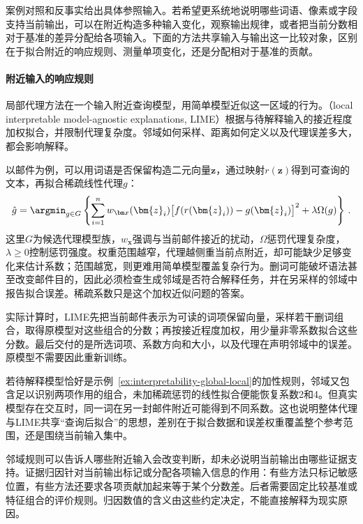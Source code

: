 案例对照和反事实给出具体参照输入。若希望更系统地说明哪些词语、像素或字段支持当前输出，可以在附近构造多种输入变化，观察输出规律，或者把当前分数相对于基准的差异分配给各项输入。下面的方法共享输入与输出这一比较对象，区别在于拟合附近的响应规则、测量单项变化，还是分配相对于基准的贡献。

\paragraph{附近输入的响应规则}
\label{sec:interpretability-local-neighborhood}

局部代理方法在一个输入附近查询模型，用简单模型近似这一区域的行为。（local interpretable model-agnostic explanations, LIME）根据与待解释输入的接近程度加权拟合，并限制代理复杂度。邻域如何采样、距离如何定义以及代理误差多大，都会影响解释。

以邮件为例，可以用词语是否保留构造二元向量$\bm{z}$，通过映射$r(\bm{z})$得到可查询的文本，再拟合稀疏线性代理$g$：
\begin{equation}
 \hat g=\argmin_{g\in G}\left\{
 \sum_{i=1}^{n}w_{\bm x}(\bm{z}_i)
 \bigl[f(r(\bm{z}_i))-g(\bm{z}_i)\bigr]^2
 +\lambda\Omega(g)\right\}\, .
 \label{eq:interpretability-lime}
\end{equation}
这里$G$为候选代理模型族，$w_{\bm x}$强调与当前邮件接近的扰动，$\Omega$惩罚代理复杂度，$\lambda\geq0$控制惩罚强度。权重范围越窄，代理越侧重当前点附近，却可能缺少足够变化来估计系数；范围越宽，则更难用简单模型覆盖复杂行为。删词可能破坏语法甚至改变邮件目的，因此必须检查生成邻域是否符合解释任务，并在另采样的邻域中报告拟合误差。稀疏系数只是这个加权近似问题的答案。

实际计算时，LIME先把当前邮件表示为可读的词项保留向量，采样若干删词组合，取得原模型对这些组合的分数；再按接近程度加权，用少量非零系数拟合这些分数。最后交付的是所选词项、系数方向和大小，以及代理在声明邻域中的误差。原模型不需要因此重新训练。

若待解释模型恰好是示例~\ref{ex:interpretability-global-local}的加性规则，邻域又包含足以识别两项作用的组合，未加稀疏惩罚的线性拟合便能恢复系数2和4。但真实模型存在交互时，同一词在另一封邮件附近可能得到不同系数。这也说明整体代理与LIME共享“查询后拟合”的思想，差别在于拟合数据和误差权重覆盖整个参考范围，还是围绕当前输入集中。

邻域规则可以告诉人哪些附近输入会改变判断，却未必说明当前输出由哪些证据支持。证据归因针对当前输出标记或分配各项输入信息的作用：有些方法只标记敏感位置，有些方法还要求各项贡献加起来等于某个分数差。后者需要固定比较基准或特征组合的评价规则。归因数值的含义由这些约定决定，不能直接解释为现实原因。

